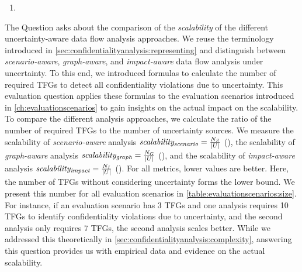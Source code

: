 \begin{enumerate}[leftmargin=\GQMquestionsIndent]
  \item[\question{7}{1}] \textGviiQi 
\end{enumerate}

\label{gqm:text:q:7:1}
The Question  asks about the comparison of the \emph{scalability} of the different uncertainty-aware data flow analysis approaches.
We reuse the terminology introduced in \autoref{sec:confidentialityanalysis:representing} and distinguish between \emph{scenario-aware}, \emph{graph-aware}, and \emph{impact-aware} data flow analysis under uncertainty.
To this end, we introduced formulas to calculate the number of required \acp{TFG} to detect all confidentiality violations due to uncertainty.
This evaluation question applies these formulas to the evaluation scenarios introduced in \autoref{ch:evaluationscenarios} to gain insights on the actual impact on the scalability.
To compare the different analysis approaches, we calculate the ratio of the number of required \acp{TFG} to the number of uncertainty sources.
We measure the scalability of \emph{scenario-aware} analysis $\emph{scalability\textsubscript{scenario}}=\frac{N_{S}}{\lvert U\rvert}$ (\label{gqm:text:m:7:1:1}), the scalability of \emph{graph-aware} analysis $\emph{scalability\textsubscript{graph}}=\frac{N_{G}}{\lvert U\rvert}$ (\label{gqm:text:m:7:1:2}), and the scalability of \emph{impact-aware} analysis $\emph{scalability\textsubscript{impact}}=\frac{N_{I}}{\lvert U\rvert}$ (\label{gqm:text:m:7:1:3}).
For all metrics, lower values are better.
Here, the number of \acp{TFG} without considering uncertainty forms the lower bound.
We present this number for all evaluation scenarios in \autoref{table:evaluationscenarios:size}.
For instance, if an evaluation scenario has 3 \acp{TFG} and one analysis requires 10 \acp{TFG} to identify confidentiality violations due to uncertainty, and the second analysis only requires 7 \acp{TFG}, the second analysis scales better.
While we addressed this theoretically in \autoref{sec:confidentialityanalysis:complexity}, answering this question provides us with empirical data and evidence on the actual scalability.


